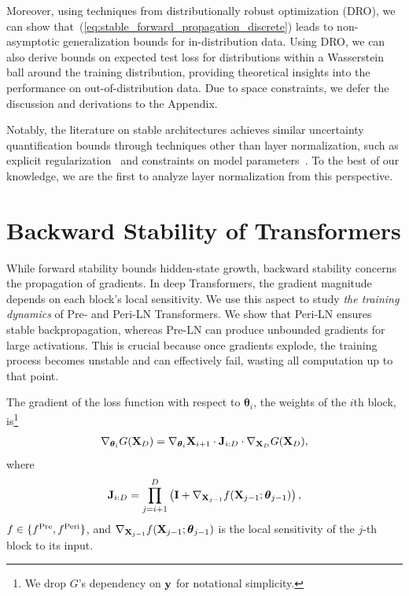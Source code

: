 \documentclass[journal]{IEEEtran}
\def\eqref#1{equation~\ref{#1}}
\newcommand{\bfI}{{\bf I}}
\newcommand{\bfJ}{{\bf J}}
\newcommand{\bfX}{{\bf X}}
\newcommand{\bfy}{ {\bf y}}
\newcommand{\bftheta}{{\boldsymbol \theta}}
\renewcommand{\eqref}[1]{(\ref{#1})}
\theoremstyle{plain}
\theoremstyle{definition}
\theoremstyle{remark}
\begin{document}
Moreover, using techniques from distributionally robust optimization (DRO), we can show that~\eqref{eq:stable_forward_propagation_discrete} leads to non-asymptotic generalization bounds for in-distribution data. Using DRO, we can also derive bounds on expected test loss for distributions within a Wasserstein ball around the training distribution, providing theoretical insights into the performance on out-of-distribution data. Due to space constraints, we defer the discussion and derivations to the Appendix.

Notably, the literature on stable architectures achieves similar uncertainty quantification bounds through techniques other than layer normalization, such as explicit regularization~\cite{kan2025optimal} and constraints on model parameters~\cite{haber2017stable,ruthotto2020deep}. To the best of our knowledge, we are the first to analyze layer normalization from this perspective.

\section{Backward Stability of Transformers}\label{sec:backward}
While forward stability bounds hidden-state growth, backward stability concerns the propagation of gradients. In deep Transformers, the gradient magnitude depends on each block’s local sensitivity. We use this aspect to study \emph{the training dynamics} of Pre- and Peri-LN Transformers. We show that Peri-LN ensures stable backpropagation, whereas Pre-LN can produce unbounded gradients for large activations. This is crucial because once gradients explode, the training process becomes unstable and can effectively fail, wasting all computation up to that point.

The gradient of the loss function with respect to $\bftheta_i$, the weights of the $i$th block, is\footnote{We drop $G$'s dependency on $\bfy$ for notational simplicity.}
\begin{align}\label{eq:backprop_grad}
\nabla_{\bftheta_i} G(\bfX_D) 
= \nabla_{\bftheta_i} \bfX_{i+1} \cdot
  \bfJ_{i:D} \cdot
\nabla_{\bfX_D} G(\bfX_D),
\end{align}
where 
\begin{equation}\label{eq:gradient_product_theorem}
    \bfJ_{i:D} =  \prod_{j=i+1}^D \left( \bfI + \nabla_{\bfX_{j-1}} f(\bfX_{j-1}; \bftheta_{j-1})\right) ,
\end{equation}
$f \in \{ f^{\rm Pre}, f^{\rm Peri}\}$, and $\nabla_{\bfX_{j-1}} f(\bfX_{j-1}; \bftheta_{j-1})$ is the local sensitivity of the $j$-th block to its input.
\end{document}
